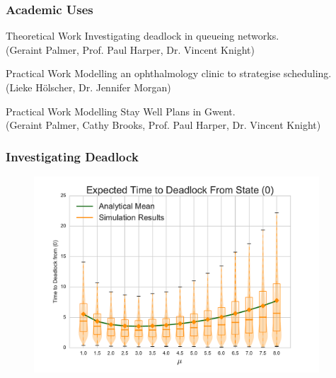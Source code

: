 \documentclass{beamer}
\begin{document}
\begin{frame}
\frametitle{Academic Uses}
\vfill
\begin{block}{Theoretical Work}
Investigating deadlock in queueing networks.\\
(Geraint Palmer, Prof. Paul Harper, Dr. Vincent Knight)
\end{block}
\vfill
\begin{block}{Practical Work}
Modelling an ophthalmology clinic to strategise scheduling.\\
(Lieke H\"{o}lscher, Dr. Jennifer Morgan)
\end{block}
\vfill
\begin{block}{Practical Work}
Modelling Stay Well Plans in Gwent.\\
(Geraint Palmer, Cathy Brooks, Prof. Paul Harper, Dr. Vincent Knight)
\end{block}
\vfill
\end{frame}

\begin{frame}
\frametitle{Investigating Deadlock}
\begin{figure}
    
\end{figure}
\end{frame}

\begin{frame}
\begin{figure}
    \includegraphics[width=0.95\textwidth]{varymu_1Nms}
\end{figure}
\end{frame}
\end{document}

